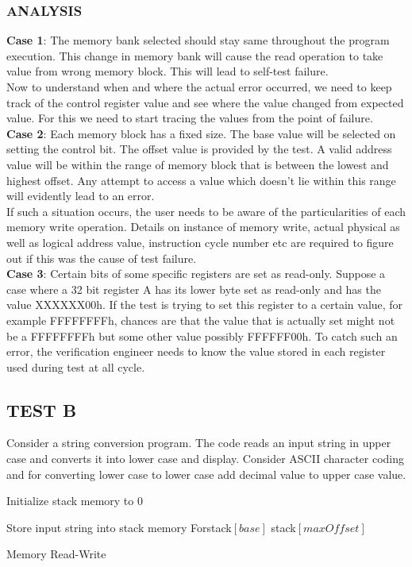\subsubsection{ANALYSIS}
{\bf Case 1}: The memory bank selected should stay same throughout the program execution. This change in memory bank will cause the read operation to take value from wrong memory block. This will lead to self-test failure. \\
 Now to understand when and where the actual error occurred, we need to keep track of the control register value and see where the value changed from expected value. For this we need to start tracing the values from the point of failure. \\
{\bf Case 2}: Each memory block has a fixed size. The base value will be selected on setting the control bit. The offset value is provided by the test. A valid address value will be within the range of memory block that is between the lowest and highest offset. Any attempt to access a value which doesn't lie within this range will evidently lead to an error.\\
If such a situation occurs, the user needs to be aware of the particularities of each memory write operation. Details on instance of memory write, actual physical as well as logical address value, instruction cycle number etc are required to figure out if this was the cause of test failure.\\
{\bf Case 3}: Certain bits of some specific registers are set as read-only. Suppose a case where a 32 bit register A has its lower byte set as read-only and has the value XXXXXX00h. If the test is trying to set this register to a certain value, for example FFFFFFFFh, chances are that the value that is actually set might not be a FFFFFFFFh but some other value possibly FFFFFF00h. 
To catch such an error, the verification engineer needs to know the value stored in each register used during test at all cycle.



\subsection {TEST B}
Consider a string conversion program. The code reads an input string in upper case and converts it into lower case and display. Consider ASCII character coding and for converting lower case to lower case add decimal value to upper case value. 
\IncMargin{1em}
\begin{algorithm}[H]
\DontPrintSemicolon
{}

\BlankLine
Initialize stack memory to 0 \;

	Store input string into stack memory\;
	For{stack$[base]$ \KwTo stack$[maxOffset]$}{\;
		
	}

\caption{Memory Read-Write}
\end{algorithm}\DecMargin{1em}

